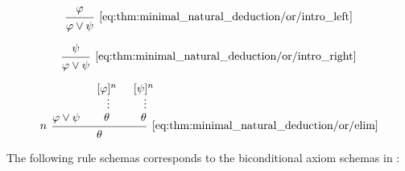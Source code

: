 \begin{proposition}
\begin{thmenum}
    \begin{minipage}{0.3\textwidth}
      \begin{equation*}\taglabel[\textrm{R} \( \vee_L^+ \)]{eq:thm:minimal_natural_deduction/or/intro_left}
        \begin{prooftree}
          \hypo{ \varphi }
          \infer1[\ref{eq:thm:minimal_natural_deduction/or/intro_left}]{ \varphi \vee \psi }
        \end{prooftree}
      \end{equation*}
    \end{minipage}
    \hfill
    \begin{minipage}{0.3\textwidth}
      \begin{equation*}\taglabel[\textrm{R} \( \vee_R^+ \)]{eq:thm:minimal_natural_deduction/or/intro_right}
        \begin{prooftree}
          \hypo{ \psi }
          \infer1[\ref{eq:thm:minimal_natural_deduction/or/intro_right}]{ \varphi \vee \psi }
        \end{prooftree}
      \end{equation*}
    \end{minipage}
    \hfill
    \begin{minipage}{0.3\textwidth}
      \begin{equation*}\taglabel[\textrm{R} \( \vee^- \)]{eq:thm:minimal_natural_deduction/or/elim}
        \begin{prooftree}
          \hypo{ \varphi \vee \psi }
          \hypo{ [\varphi]^n }
          \ellipsis {} { \theta }
          \hypo{ [\psi]^n }
          \ellipsis {} { \theta }
          \infer[left label=\( n \)]3[\ref{eq:thm:minimal_natural_deduction/or/elim}]{ \theta }
        \end{prooftree}
      \end{equation*}
    \end{minipage}

     The following rule schemas corresponds to the biconditional axiom schemas in :


\end{thmenum}
\end{proposition}
